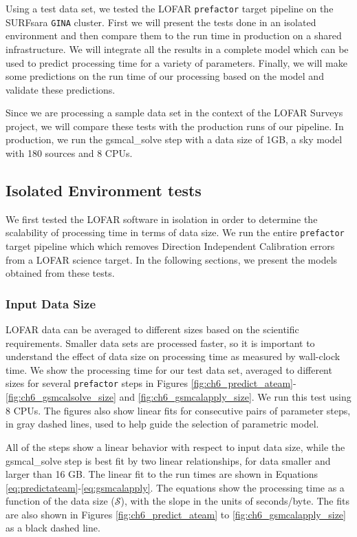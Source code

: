 
Using a test data set, we tested the LOFAR \texttt{prefactor} target pipeline on the SURFsara \texttt{GINA} cluster. First we will present the tests done in an isolated environment and then compare them to the run time in production on a shared infrastructure. We will integrate all the results in a complete model which can be used to predict processing time for a variety of parameters. Finally, we will make some predictions on the run time of our processing based on the model and validate these predictions. 

Since we are  processing a sample data set in the context of the LOFAR Surveys project, we will compare these tests with the production runs of our pipeline. In production, we run  the {\selectfont gsmcal\_solve} step with a data size of 1GB, a sky model with 180 sources and 8 CPUs. 
 

\subsection{Isolated Environment tests}
We first tested the LOFAR software in isolation in order to determine the scalability of processing time in terms of data size. We run the entire \texttt{prefactor} target pipeline which which removes Direction Independent Calibration errors from a LOFAR science target. In the following sections, we present the models obtained from these tests.  

\subsubsection{Input Data Size}\label{sec:ch6_results_size}
LOFAR data can be averaged to different sizes based on the scientific requirements. Smaller data sets are processed faster, so it is important to understand the effect of data size on processing time as measured by wall-clock time. We show the processing time for our test data set, averaged to different sizes for several \texttt{prefactor} steps in Figures \ref{fig:ch6_predict_ateam}- \ref{fig:ch6_gsmcalsolve_size} and \ref{fig:ch6_gsmcalapply_size}. We run this test using 8 CPUs. The figures also show linear fits for consecutive pairs of parameter steps, in gray dashed lines, used to help guide the selection of parametric model. 

All of the steps show a linear behavior with respect to input data size, while the {\selectfont gsmcal\_solve step} is best fit by two linear relationships, for data smaller and larger than 16 GB. The linear fit to the run times are shown in Equations \ref{eq:predictateam}-\ref{eq:gsmcalapply}. The equations show the processing time as a function of the data size ($\mathcal{S}$), with the slope in the units of seconds/byte. The fits are also shown in Figures \ref{fig:ch6_predict_ateam} to \ref{fig:ch6_gsmcalapply_size} as a black dashed line.

